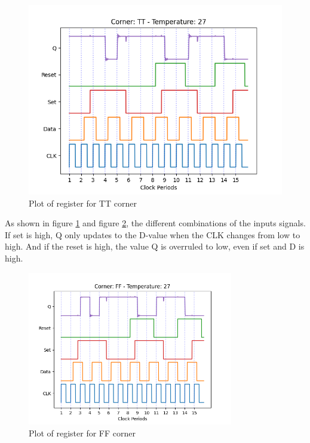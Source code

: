 \begin{figure}[H]
    \centering
    \includegraphics[width=\textwidth]{Figures/Aimspice_Plots/TT_27.png}
    \caption{Plot of register for TT corner}
    \label{fig:result_TT27}
\end{figure}

As shown in figure \ref{fig:result_TT27} and figure \ref{fig:result_FF27}, the different combinations of the inputs signals. If set is high, Q only updates to the D-value when the CLK changes from low to high. And if the reset is high, the value Q is overruled to low, even if set and D is high.

\begin{figure}[H]
    \centering
    \includegraphics[width=0.8\textwidth]{Figures/Aimspice_Plots/FF_27.png}
    \caption{Plot of register for FF corner}
    \label{fig:result_FF27}
\end{figure}

